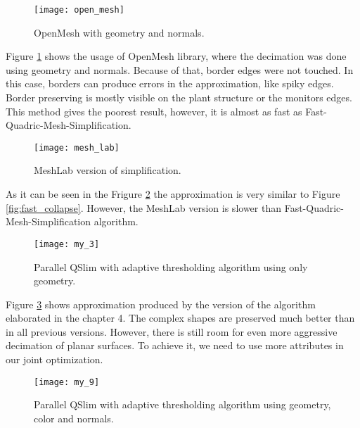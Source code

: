 \begin{figure}[H]
  \begin{center}
    \texttt{[image: open\_mesh]}
    \caption{OpenMesh with geometry and normals.}
    \label{fig:open_mesh}
  \end{center}
\end{figure}

Figure \ref{fig:open_mesh} shows the usage of OpenMesh library, where the decimation was done using geometry and normals. Because of that, border edges were not touched. In this case, borders can produce errors in the approximation, like spiky edges. Border preserving is mostly visible on the plant structure or the monitors edges. This method gives the poorest result, however, it is almost as fast as Fast-Quadric-Mesh-Simplification.

\begin{figure}[H]
  \begin{center}
    \texttt{[image: mesh\_lab]}
    \caption{MeshLab version of simplification.}
    \label{fig:mesh_lab}
  \end{center}
\end{figure}

As it can be seen in the Frigure \ref{fig:mesh_lab} the approximation is very similar to Figure \ref{fig:fast_collapse}. However, the MeshLab version is slower than Fast-Quadric-Mesh-Simplification algorithm.

\begin{figure}[H]
  \begin{center}
    \texttt{[image: my\_3]}
    \caption{Parallel QSlim with adaptive thresholding algorithm using only geometry.}
    \label{fig:my_3}
  \end{center}
\end{figure}

Figure \ref{fig:my_3} shows approximation produced by the version of the algorithm elaborated in the chapter 4. The complex shapes are preserved much better than in all previous versions. However, there is still room for even more aggressive decimation of planar surfaces. To achieve it, we need to use more attributes in our joint optimization.

\begin{figure}[H]
  \begin{center}
    \texttt{[image: my\_9]}
    \caption{Parallel QSlim with adaptive thresholding algorithm using geometry, color and normals.}
    \label{fig:my_9}
  \end{center}
\end{figure}

